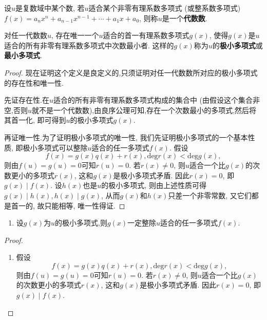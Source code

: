 \documentclass[../../main.tex]{subfiles}%
\begin{document}
\begin{definition}[代数数]\label{definition:代数数}
设\(u\)是复数域中某个数, 若\(u\)适合某个非零有理系数多项式 (或整系数多项式)\(f(x)=a_nx^n + a_{n - 1}x^{n - 1}+\cdots+a_1x + a_0\), 则称\(u\)是一个\textbf{代数数}.
\end{definition}

\begin{definition}\label{definition:极小多项式(最小多项式)}
对任一代数数\(u\), 存在唯一一个\(u\)适合的首一有理系数多项式\(g(x)\), 使得\(g(x)\)是\(u\)适合的所有非零有理系数多项式中次数最小者. 这样的\(g(x)\)称为\(u\)的\textbf{极小多项式}或\textbf{最小多项式}.
\end{definition}
\begin{proof}

现在证明这个定义是良定义的,只须证明对任一代数数所对应的极小多项式的存在性和唯一性.

先证存在性.在\(u\)适合的所有非零有理系数多项式构成的集合中 (由假设这个集合非空,否则$u$就不是一个代数数),由良序公理可知,存在一个次数最小的多项式,然后将其首一化, 即可得到\(u\)的极小多项式\(g(x)\). 

再证唯一性.为了证明极小多项式的唯一性, 我们先证明极小多项式的一个基本性质, 即极小多项式可以整除\(u\)适合的任一多项式\(f(x)\). 假设
\[
f(x)=g(x)q(x)+r(x), \mathrm{deg }r(x)<\mathrm{deg }g(x),
\]
则由\(f(u)=g(u)=0\)可知\(r(u)=0\). 若\(r(x)\neq 0\), 则\(u\)适合一个比\(g(x)\)的次数更小的多项式\(r(x)\), 这和\(g(x)\)是极小多项式矛盾. 因此\(r(x)=0\), 即\(g(x)\mid f(x)\). 设\(h(x)\)也是\(u\)的极小多项式, 则由上述性质可得\(g(x)\mid h(x), h(x)\mid g(x)\), 从而\(g(x)\)和\(h(x)\)只差一个非零常数, 又它们都是首一的, 故只能相等, 唯一性得证.

\end{proof}

\begin{proposition}[极小多项式的基本性质]\label{proposition:极小多项式的基本性质}
\begin{enumerate}[(1)]
\item 设$g(x)$为$u$的极小多项式,则$g(x)$一定整除\(u\)适合的任一多项式\(f(x)\).
\end{enumerate}
\end{proposition}
\begin{proof}
\begin{enumerate}[(1)]
\item 假设
\[
f(x)=g(x)q(x)+r(x), \mathrm{deg }r(x)<\mathrm{deg }g(x),
\]
则由\(f(u)=g(u)=0\)可知\(r(u)=0\). 若\(r(x)\neq 0\), 则\(u\)适合一个比\(g(x)\)的次数更小的多项式\(r(x)\), 这和\(g(x)\)是极小多项式矛盾. 因此\(r(x)=0\), 即\(g(x)\mid f(x)\). 
\end{enumerate}

\end{proof}
\end{document}
